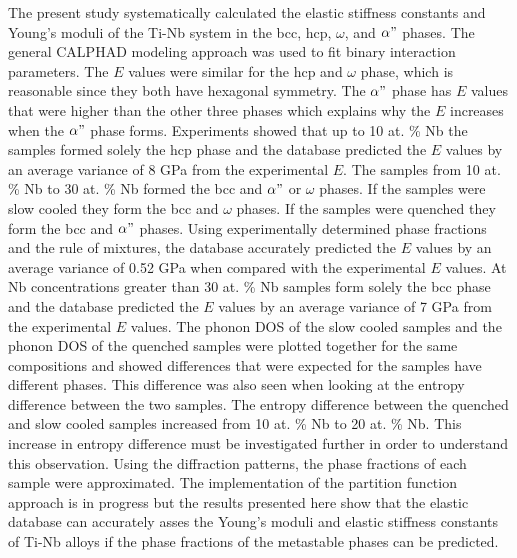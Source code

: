 The present study systematically calculated the elastic stiffness constants and Young's moduli of the Ti-Nb system in the bcc, hcp, $\omega$, and $\alpha"$ phases. The general CALPHAD modeling approach was used to fit binary interaction parameters. The $E$ values were similar for the hcp and $\omega$ phase, which is reasonable since they both have hexagonal symmetry. The $\alpha"$ phase has $E$ values that were higher than the other three phases which explains why the $E$ increases when the $\alpha"$ phase forms. Experiments showed that up to 10 at. \% Nb the samples formed solely the hcp phase and the database predicted the $E$ values by an average variance of 8 GPa from the experimental $E$. The samples from 10 at. \% Nb to 30 at. \% Nb formed the bcc and $\alpha"$ or $\omega$ phases. If the samples were slow cooled they form the bcc and $\omega$ phases. If the samples were quenched they form the bcc and $\alpha"$ phases. Using experimentally determined phase fractions and the rule of mixtures, the database accurately predicted the $E$ values by an average variance of 0.52 GPa when compared with the experimental $E$ values. At Nb concentrations greater than 30 at. \% Nb samples form solely the bcc phase and the database predicted the $E$ values by an average variance of 7 GPa from the experimental $E$ values. The phonon DOS of the slow cooled samples and the phonon DOS of the quenched samples were plotted together for the same compositions and showed differences that were expected for the samples have different phases. This difference was also seen when looking at the entropy difference between the two samples. The entropy difference between the quenched and slow cooled samples increased from 10 at. \% Nb to 20 at. \% Nb. This increase in entropy difference must be investigated further in order to understand this observation. Using the diffraction patterns, the phase fractions of each sample were approximated. The implementation of the partition function approach is in progress but the results presented here show that the elastic database can accurately asses the Young's moduli and elastic stiffness constants of Ti-Nb alloys if the phase fractions of the metastable phases can be predicted.

